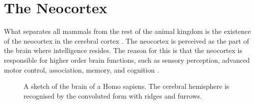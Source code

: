 \section{The Neocortex}
What separates all mammals from the rest of the animal kingdom is the existence of the neocortex in the cerebral cortex \cite{Neocortex}. The neocortex is perceived as the part of the brain where intelligence resides. The reason for this is that the neocortex is responsible for higher order brain functions, such as sensory perception, advanced motor control, association, memory, and cognition \cite{LodatoSimona2015GNDi}.  



\begin{figure}[ht!]
    \centering
    \caption{\cite{BrainSketch} A sketch of the brain of a Homo sapiens. The cerebral hemisphere is recognised by the convoluted form with ridges and furrows.}
    \label{fig:forebrain}
\end{figure}


